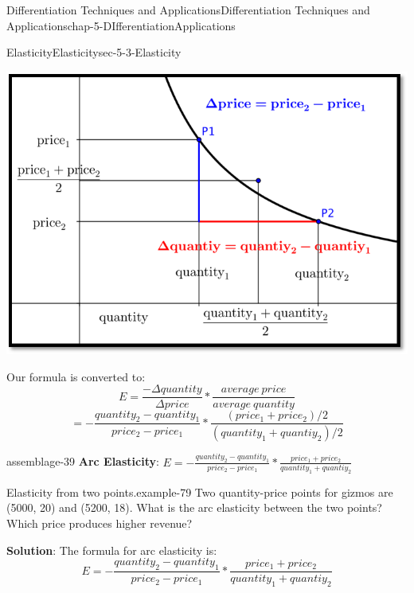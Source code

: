 \documentclass[oneside,10pt,]{book}
\newcommand{\terminology}[1]{\textbf{#1}}
\numberwithin{equation}{section}
\begin{document}
\begin{chapterptx}{Differentiation Techniques and Applications}{}{Differentiation Techniques and Applications}{}{}{chap-5-DIfferentiationApplications}
\begin{sectionptx}{Elasticity}{}{Elasticity}{}{}{sec-5-3-Elasticity}
\begin{sidebyside}{1}{0.15}{0.15}{0}%
\begin{sbspanel}{0.7}%
\includegraphics[width=1\linewidth]{images/sec5-3-3.png}
\end{sbspanel}%
\end{sidebyside}%
\par
\hypertarget{p-2051}{}%
Our formula is converted to:%
%
\begin{equation*}
E=\frac{-\Delta quantity}{\Delta price}*\frac{average\ price}{average\ quantity}
\end{equation*}
%
\begin{equation*}
=-\frac{quantity_2-quantity_1}{price_2-price_1} *\frac{(price_1+price_2)/2}{(quantity_1+quantiy_2)/2}
\end{equation*}
\begin{assemblage}{}{assemblage-39}%
\hypertarget{p-2052}{}%
\terminology{Arc Elasticity}:  \(E=-\frac{quantity_2-quantity_1}{price_2-price_1} *\frac{price_1+price_2}{quantity_1+quantiy_2}\)%
\end{assemblage}
\begin{example}{Elasticity from two points.}{example-79}%
\hypertarget{p-2053}{}%
Two quantity-price points for gizmos are (5000, 20) and (5200, 18).  What is the arc elasticity between the two points?  Which price produces higher revenue?%
\par
\hypertarget{p-2054}{}%
\terminology{Solution}:  The formula for arc elasticity is:%
%
\begin{equation*}
E=-\frac{quantity_2-quantity_1}{price_2-price_1} *\frac{price_1+price_2}{quantity_1+quantiy_2}
\end{equation*}

\end{example}
\end{sectionptx}
\end{chapterptx}
\end{document}
